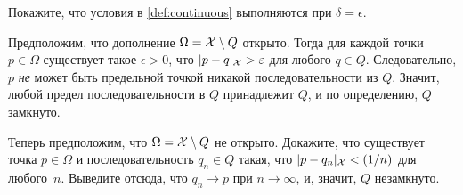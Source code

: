 Покажите, что условия в \ref{def:continuous} выполняются при $\delta=\epsilon$.

Предположим, что дополнение $\Omega=\mathcal{X}\setminus Q$ открыто.
Тогда для каждой точки $p\in \Omega$ существует такое $\epsilon>0$, что $\dist{p}{q}{\spc{X}}>\epsilon$ для любого $q\in Q$.
Следовательно, $p$ \textit{не} может быть предельной точкой никакой последовательности из $Q$.
Значит, любой предел последовательности в $Q$ принадлежит $Q$,
и по определению, $Q$ замкнуто.

Теперь предположим, что $\Omega=\mathcal{X}\setminus Q$ не открыто.
Докажите, что существует точка $p\in \Omega$ и последовательность $q_n\in Q$ такая, что $\dist{p}{q_n}{\spc{X}}<\tfrac1n$ для любого~$n$.
Выведите отсюда, что $q_n\to p$ при $n\to \infty$, и, значит, $Q$ незамкнуто.


\spell{\end{multicols}}{}
